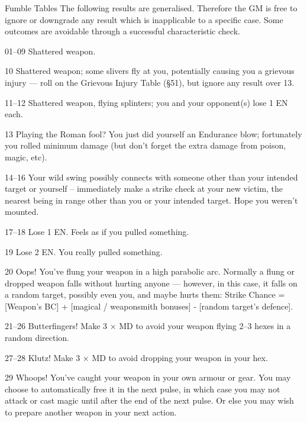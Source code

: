 \begin{Chapter}{Fumble Tables}
The following results are generalised.  Therefore the GM is free to
ignore or downgrade any result which is inapplicable to a specific
case.  Some outcomes are avoidable through a successful characteristic
check.

\begin{Description}
  
\item[01–09] Shattered weapon.

\item[10] Shattered weapon; some slivers fly at you, potentially
  causing you a grievous injury — roll on the Grievous Injury Table
  (§51), but ignore any result over 13.

\item[11–12] Shattered weapon, flying splinters; you and your
  opponent(s) lose 1 EN each.

\item[13] Playing the Roman fool? You just did yourself an Endurance
  blow; fortunately you rolled minimum damage (but don’t forget the
  extra damage from poison, magic, etc).

\item[14–16] Your wild swing possibly connects with someone other than
  your intended target or yourself – immediately make a strike check
  at your new victim, the nearest being in range other than you or
  your intended target.  Hope you weren’t mounted.

\item[17–18] Lose 1 EN. Feels as if you pulled something.


\item[19] Lose 2 EN. You really pulled something.

\item[20] Oops! You’ve flung your weapon in a high parabolic
  arc. Normally a flung or dropped weapon falls without hurting anyone
  — however, in this case, it falls on a random target, possibly even
  you, and maybe hurts them: Strike Chance = [Weapon’s BC] + [magical
    / weaponsmith bonuses] - [random target’s defence].

\item[21–26] Butterfingers! Make 3 × MD to avoid your weapon flying
  2–3 hexes in a random direction.

\item[27–28] Klutz! Make 3 × MD to avoid dropping your weapon in your
  hex.

\item[29] Whoops! You’ve caught your weapon in your own armour or
  gear. You may choose to automatically free it in the next pulse, in
  which case you may not attack or cast magic until after the end of
  the next pulse. Or else you may wish to prepare another weapon in
  your next action.


\end{Description}
\end{Chapter}
